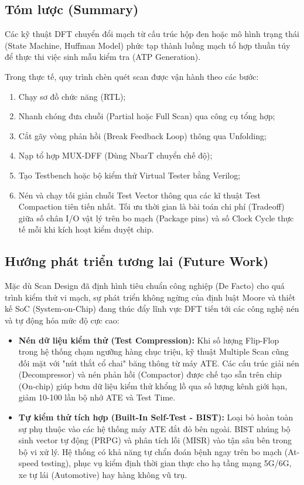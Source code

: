 \subsection{Tóm lược (Summary)}
Các kỹ thuật DFT chuyển đổi mạch từ cấu trúc hộp đen hoặc mô hình trạng thái (State Machine, Huffman Model) phức tạp thành luồng mạch tổ hợp thuần túy để thực thi việc sinh mẫu kiểm tra (ATP Generation). 

Trong thực tế, quy trình chèn quét scan được vận hành theo các bước: 
\begin{enumerate}
    \item Chạy sơ đồ chức năng (RTL);
    \item Nhanh chóng đưa chuỗi (Partial hoặc Full Scan) qua công cụ tổng hợp;
    \item Cắt gãy vòng phản hồi (Break Feedback Loop) thông qua Unfolding;
    \item Nạp tổ hợp MUX-DFF (Dùng NbarT chuyển chế độ);
    \item Tạo Testbench hoặc bộ kiểm thử Virtual Tester bằng Verilog;
    \item Nén và chạy tối giản chuỗi Test Vector thông qua các kĩ thuật Test Compaction tiên tiến nhất. Tối ưu thời gian là bài toán chi phí (Tradeoff) giữa số chân I/O vật lý trên bo mạch (Package pins) và số Clock Cycle thực tế mỗi khi kích hoạt kiểm duyệt chip.
\end{enumerate}

\subsection{Hướng phát triển tương lai (Future Work)}
Mặc dù Scan Design đã định hình tiêu chuẩn công nghiệp (De Facto) cho quá trình kiểm thử vi mạch, sự phát triển không ngừng của định luật Moore và thiết kế SoC (System-on-Chip) đang thúc đẩy lĩnh vực DFT tiến tới các công nghệ nén và tự động hóa mức độ cực cao:
\begin{itemize}
    \item \textbf{Nén dữ liệu kiểm thử (Test Compression):} Khi số lượng Flip-Flop trong hệ thống chạm ngưỡng hàng chục triệu, kỹ thuật Multiple Scan cũng đối mặt với "nút thắt cổ chai" băng thông từ máy ATE. Các cấu trúc giải nén (Decompressor) và nén phản hồi (Compactor) được chế tạo sẵn trên chip (On-chip) giúp bơm dữ liệu kiểm thử khổng lồ qua số lượng kênh giới hạn, giảm 10-100 lần bộ nhớ ATE và Test Time.
    \item \textbf{Tự kiểm thử tích hợp (Built-In Self-Test - BIST):} Loại bỏ hoàn toàn sự phụ thuộc vào các hệ thống máy ATE đắt đỏ bên ngoài. BIST nhúng bộ sinh vector tự động (PRPG) và phân tích lỗi (MISR) vào tận sâu bên trong bộ vi xử lý. Hệ thống có khả năng tự chẩn đoán bệnh ngay trên bo mạch (At-speed testing), phục vụ kiểm định thời gian thực cho hạ tầng mạng 5G/6G, xe tự lái (Automotive) hay hàng không vũ trụ.
\end{itemize}
